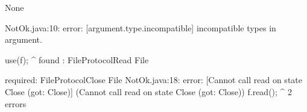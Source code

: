 \lstset{language=,caption=Original Mungo output}
\begin{code}
None
\end{code}

\lstset{language=,caption=New Mungo output}
\begin{code}
NotOk.java:10: error: [argument.type.incompatible] incompatible types in argument.

        use(f);
            ^
  found   : FileProtocol{Read} File

  required: FileProtocol{Close} File
NotOk.java:18: error: [Cannot call read on state Close (got: Close)] (Cannot call read on state Close (got: Close))
    f.read();
          ^
2 errors
\end{code}

